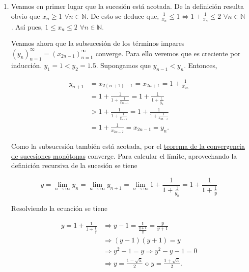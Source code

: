 \documentclass[
  spanish,
  a4paper,
]{scrreport}
\theoremstyle{definition}
\theoremstyle{remark}
\begin{document}
\begin{tcolorbox}[enhanced jigsaw, arc=.35mm, bottomrule=.15mm, bottomtitle=1mm, breakable, colback=white, colbacktitle=quarto-callout-tip-color!10!white, colframe=quarto-callout-tip-color-frame, coltitle=black, left=2mm, leftrule=.75mm, opacityback=0, opacitybacktitle=0.6, rightrule=.15mm, title=\textcolor{quarto-callout-tip-color}{\faLightbulb}\hspace{0.5em}{Solución}, titlerule=0mm, toprule=.15mm, toptitle=1mm]

\begin{enumerate}
\def\labelenumi{\alph{enumi}.}
\item
  Veamos en primer lugar que la sucesión está acotada. De la definición
  resulta obvio que \(x_n\geq 1\) \(\forall n\in\mathbb{N}\). De esto se
  deduce que,
  \(\frac{1}{x_n}\leq 1 \Leftrightarrow 1+\frac{1}{x_n} \leq 2\)
  \(\forall n\in\mathbb{N}\). Así pues, \(1\leq x_n\leq 2\)
  \(\forall n\in\mathbb{N}\).

  Veamos ahora que la subsucesión de los términos impares
  \((y_n)_{n=1}^\infty = (x_{2n-1})_{n=1}^\infty\) converge. Para ello
  veremos que es creciente por inducción. \(y_1=1<y_2=1.5\). Supongamos
  que \(y_{n-1}<y_n\). Entonces,

  \begin{align*}
   y_{n+1} &= x_{2(n+1)-1} = x_{2n+1} = 1+\frac{1}{x_{2n}} \\ 
   &= 1+\frac{1}{1+\frac{1}{x_{2n-1}}} = 1+\frac{1}{1+\frac{1}{y_n}} \\ 
   &> 1+\frac{1}{1+\frac{1}{y_{n-1}}} = 1+\frac{1}{1+\frac{1}{x_{2n-3}}} \\
   &= 1+\frac{1}{x_{2n-2}} = x_{2n-1} = y_n.
   \end{align*}

  Como la subsucesión también está acotada, por el
  \href{https://aprendeconalf.es/analisis-manual/sucesiones.html\#thm-convergencia-monotona}{teorema
  de la convergencia de sucesiones monótonas} converge. Para calcular el
  límite, aprovechando la definición recursiva de la sucesión se tiene

  \[
   y = \lim_{n\to\infty}y_n = \lim_{n\to\infty}y_{n+1} = \lim_{n\to\infty}1+\frac{1}{1+\frac{1}{y_n}} = 1+\frac{1}{1+\frac{1}{y}}
   \]

  Resolviendo la ecuación se tiene

  \begin{align*}
   y=1+\frac{1}{1+\frac{1}{y}} &\Rightarrow y-1= \frac{1}{\frac{y+1}{y}} = \frac{y}{y+1} \\ 
   &\Rightarrow (y-1)(y+1) = y \\ 
   & \Rightarrow y^2-1 = y \Rightarrow y^2-y-1=0 \\ 
   &\Rightarrow y=\frac{1-\sqrt{5}}{2} \mbox{ o } y=\frac{1+\sqrt{5}}{2}.
   \end{align*}


\end{enumerate}
\end{tcolorbox}
\end{document}
